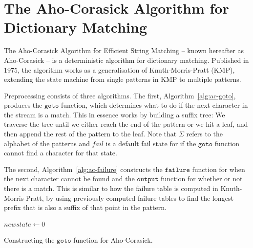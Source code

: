 \documentclass[ %
                    author={Dominic Joseph Moylett},
                    degree={MEng},
                     title={Dictionary Matching with Fingerprints},
                  subtitle={An Empirical Analysis},
                      type={Research},
                      year={2014} ]{dissertation}
\begin{document}
\section{The Aho-Corasick Algorithm for Dictionary Matching}
\label{sec:aho-corasick}

The Aho-Corasick Algorithm for Efficient String Matching\cite{Aho:1975:ESM:360825.360855} -- known hereafter as Aho-Corasick -- is a deterministic algorithm for dictionary matching. Published in 1975, the algorithm works as a generalisation of Knuth-Morris-Pratt (KMP)\cite{kmp}, extending the state machine from single patterns in KMP to multiple patterns.

Preprocessing consists of three algorithms. The first, Algorithm~\ref{alg:ac-goto}, produces the $\texttt{goto}$ function, which determines what to do if the next character in the stream is a match. This in essence works by building a suffix tree: We traverse the tree until we either reach the end of the pattern or we hit a leaf, and then append the rest of the pattern to the leaf. Note that $\Sigma$ refers to the alphabet of the patterns and $fail$ is a default fail state for if the $\texttt{goto}$ function cannot find a character for that state.

The second, Algorithm~\ref{alg:ac-failure} constructs the $\texttt{failure}$ function for when the next character cannot be found and the $\texttt{output}$ function for whether or not there is a match. This is similar to how the failure table is computed in Knuth-Morris-Pratt, by using previously computed failure tables to find the longest prefix that is also a suffix of that point in the pattern.

\begin{algorithm}[t]
$newstate \gets 0$\\
\caption{Constructing the $\texttt{goto}$ function for Aho-Corasick.}
\label{alg:ac-goto}
\end{algorithm}
\end{document}
